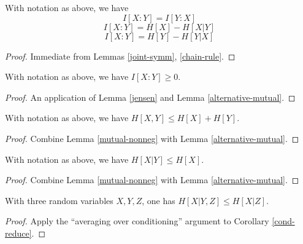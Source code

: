 \begin{lemma}\label{alternative-mutual}
  With notation as above, we have
$$  I[X : Y] = I[Y:X]$$
$$  I[X : Y] = H[X] - H[X|Y]$$
$$  I[X : Y] = H[Y] - H[Y|X]$$
\end{lemma}

\begin{proof}   
  Immediate from Lemmas \ref{joint-symm}, \ref{chain-rule}.
\end{proof}

\begin{lemma}\label{mutual-nonneg}  With notation as above, we have $I[X:Y] \geq 0$.
\end{lemma}

\begin{proof}   An application of Lemma \ref{jensen} and Lemma \ref{alternative-mutual}.
\end{proof}

\begin{corollary}[Subadditivity]\label{subadditive}  With notation as above, we have $H[X,Y] \leq H[X] + H[Y]$.
\end{corollary}

\begin{proof}  Combine Lemma \ref{mutual-nonneg} with Lemma \ref{alternative-mutual}.
\end{proof}

\begin{corollary}\label{cond-reduce}  With notation as above, we have $H[X|Y] \leq H[X]$.
\end{corollary}

\begin{proof}  Combine Lemma \ref{mutual-nonneg} with Lemma \ref{alternative-mutual}.
\end{proof}

\begin{corollary}[Submodularity]\label{submodularity}  With three random variables $X,Y,Z$, one has $H[X|Y,Z] \leq H[X|Z]$.
\end{corollary}

\begin{proof}  Apply the ``averaging over conditioning'' argument to Corollary \ref{cond-reduce}.
\end{proof}

